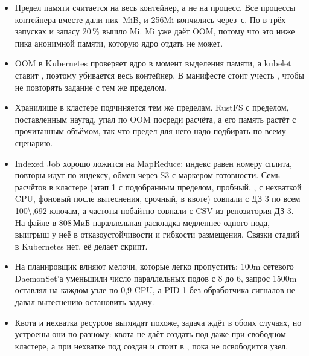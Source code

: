 \begin{itemize}
\item Предел памяти считается на весь контейнер, а не на процесс. Все процессы контейнера вместе дали пик \measPeakMax\,MiB, и 256Mi кончились через \oomSeconds\,с. По  в трёх запусках и запасу 20\,\% вышло \hwLimit Mi. \belowLimit Mi уже даёт OOM, потому что это ниже пика анонимной памяти, которую ядро отдать не может.
\item OOM в Kubernetes проверяет ядро в момент выделения памяти, а kubelet ставит , поэтому убивается весь контейнер. В манифесте стоит учесть , чтобы не повторять задание с тем же пределом.
\item Хранилище в кластере подчиняется тем же пределам. RustFS с пределом, поставленным наугад, упал по OOM посреди расчёта, а его память растёт с прочитанным объёмом, так что предел для него надо подбирать по всему сценарию.
\item Indexed Job хорошо ложится на MapReduce: индекс равен номеру сплита, повторы идут по индексу, обмен через S3 с маркером готовности. Семь расчётов в кластере (этап 1 с подобранным пределом, пробный, , с нехваткой CPU, фоновый после вытеснения, срочный, в квоте) совпали с ДЗ 3 по всем \num{100\,692} ключам, а частоты  побайтно совпали с CSV из репозитория ДЗ 3. На файле в 808\,МиБ параллельная раскладка медленнее одного пода, выигрыш у неё в отказоустойчивости и гибкости размещения. Связки стадий в Kubernetes нет, её делает скрипт.
\item На планировщик влияют мелочи, которые легко пропустить: 100m сетевого DaemonSet'а уменьшили число параллельных подов с 8 до 6, запрос 1500m оставлял на каждом узле по 0,9 CPU, а PID 1 без обработчика сигналов не давал вытеснению остановить задачу.
\item Квота и нехватка ресурсов выглядят похоже, задача ждёт в обоих случаях, но устроены они по-разному: квота не даёт создать под даже при свободном кластере, а при нехватке под создан и стоит в , пока не освободится узел.
\end{itemize}



